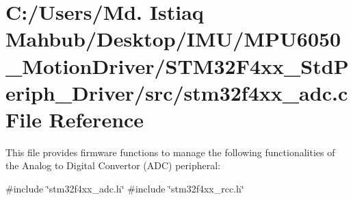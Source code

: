 \section{C\+:/\+Users/\+Md. Istiaq Mahbub/\+Desktop/\+I\+M\+U/\+M\+P\+U6050\+\_\+\+Motion\+Driver/\+S\+T\+M32\+F4xx\+\_\+\+Std\+Periph\+\_\+\+Driver/src/stm32f4xx\+\_\+adc.c File Reference}
\label{stm32f4xx__adc_8c}


This file provides firmware functions to manage the following functionalities of the Analog to Digital Convertor (A\+DC) peripheral\+:  


{\ttfamily \#include \char`\"{}stm32f4xx\+\_\+adc.\+h\char`\"{}}\newline
{\ttfamily \#include \char`\"{}stm32f4xx\+\_\+rcc.\+h\char`\"{}}\newline
